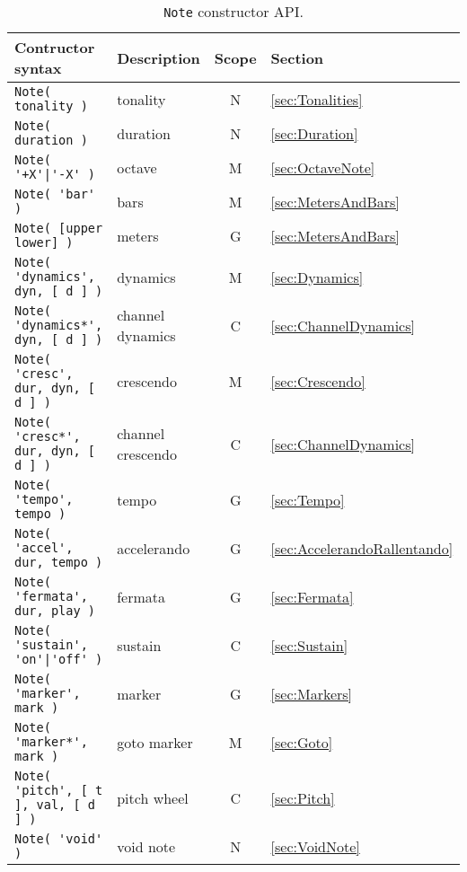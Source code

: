 \documentclass{article}
\newcommand{\note}{\lstinline!Note!\xspace}
\begin{document}
\begin{table}
	\centering
	\begin{tabular}{llcl}
		Contructor syntax & Description & Scope & Section \\
		\hline
		\lstinline!Note( tonality )! & tonality & N & \ref{sec:Tonalities} \\
		\lstinline!Note( duration )! & duration & N & \ref{sec:Duration} \\
		\lstinline!Note( '+X'|'-X' )! & octave & M & \ref{sec:OctaveNote} \\
		\lstinline!Note( 'bar' )! & bars & M & \ref{sec:MetersAndBars} \\
		\lstinline!Note( [upper lower] )! & meters & G & \ref{sec:MetersAndBars} \\
		\lstinline!Note( 'dynamics', dyn, [ d ] )! & dynamics & M & \ref{sec:Dynamics} \\
		\lstinline!Note( 'dynamics*', dyn, [ d ] )! & channel dynamics & C & \ref{sec:ChannelDynamics} \\
		\lstinline!Note( 'cresc', dur, dyn, [ d ] )! & crescendo & M & \ref{sec:Crescendo} \\
		\lstinline!Note( 'cresc*', dur, dyn, [ d ] )! & channel crescendo & C & \ref{sec:ChannelDynamics} \\
		\lstinline!Note( 'tempo', tempo )! & tempo & G & \ref{sec:Tempo} \\
		\lstinline!Note( 'accel', dur, tempo )! & accelerando & G & \ref{sec:AccelerandoRallentando} \\
		\lstinline!Note( 'fermata', dur, play )! & fermata & G & \ref{sec:Fermata} \\
		\lstinline!Note( 'sustain', 'on'|'off' )! & sustain & C & \ref{sec:Sustain} \\
		\lstinline!Note( 'marker', mark )! & marker & G & \ref{sec:Markers} \\
		\lstinline!Note( 'marker*', mark )! & goto marker & M & \ref{sec:Goto} \\
		\lstinline!Note( 'pitch', [ t ], val, [ d ] )! & pitch wheel & C & \ref{sec:Pitch} \\
		\lstinline!Note( 'void' )! & void note & N & \ref{sec:VoidNote} \\
	\end{tabular}
	\caption[\note constructor API]{\note constructor API.}
	\label{tab:NoteAPI}
\end{table}
\end{document}

